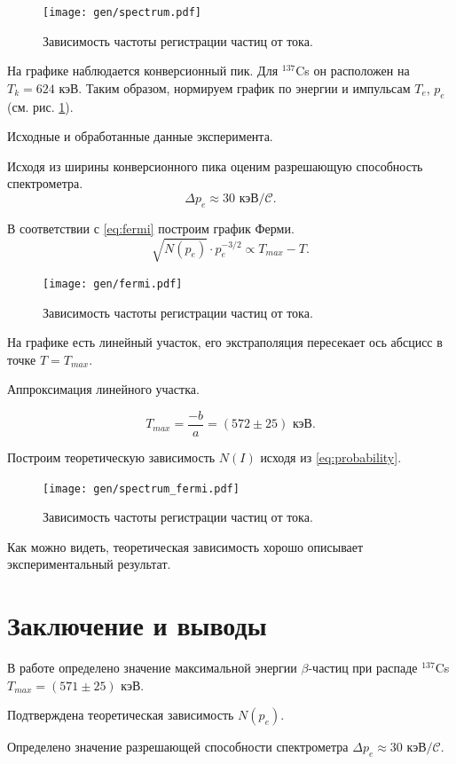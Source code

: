 \documentclass[12pt,a4paper]{article}
\newcommand{\figref}[1]{(см. рис. \ref{#1})}
\begin{document}
	\begin{figure}[H]
		\centering
		\texttt{[image: gen/spectrum.pdf]}
		\caption{Зависимость частоты регистрации частиц от тока.}
		\label{fig:exp_spectrum}
	\end{figure}

	На графике наблюдается конверсионный пик. Для $^{137}$Cs он расположен на $T_k = 624$ кэВ. Таким образом, нормируем график по энергии и импульсам $T_e$, $p_e$ \figref{fig:exp_spectrum}.
	
	\begin{table}[H]
		\footnotesize
		
		\caption{Исходные и обработанные данные эксперимента.}
		\label{tab:data}
	\end{table}

	Исходя из ширины конверсионного пика оценим разрешающую способность спектрометра.
	$$ \Delta p_e \approx 30 \text{ кэВ}/\mathcal{C}.$$
	 
	В соответствии с \eqref{eq:fermi} построим график Ферми.
	$$ \sqrt{N(p_e)} \cdot p_e^{-3/2} \propto T_{max} - T.$$

	\begin{figure}[H]
		\centering
		\texttt{[image: gen/fermi.pdf]}
		\caption{Зависимость частоты регистрации частиц от тока.}
		\label{fig:exp_fermi}
	\end{figure}
	
	На графике есть линейный участок, его экстраполяция пересекает ось абсцисс в точке $T = T_{max}$.
	
	\begin{table}[H]
		\footnotesize
		
		\caption{Аппроксимация линейного участка.}
		\label{tab:mnk}
	\end{table}
	
	$$T_{max} = \frac{-b}{a} = (572 \pm 25) \text{ кэВ}.$$
	
	Построим теоретическую зависимость $N(I)$ исходя из \eqref{eq:probability}.
	
	\begin{figure}[H]
		\centering
		\texttt{[image: gen/spectrum\_fermi.pdf]}
		\caption{Зависимость частоты регистрации частиц от тока.}
		\label{fig:th_spectrum}
	\end{figure}
	
	Как можно видеть, теоретическая зависимость хорошо описывает экспериментальный результат.
	
	\section*{Заключение и выводы}
	
	В работе определено значение максимальной энергии $\beta$-частиц при распаде $^{137}$Cs $T_{max} = (571 \pm 25)$ кэВ.
	
	Подтверждена теоретическая зависимость $N(p_e)$.
	
	Определено значение разрешающей способности спектрометра $\Delta p_e \approx 30 \text{ кэВ}/{\mathcal{C}}$.
\end{document}
